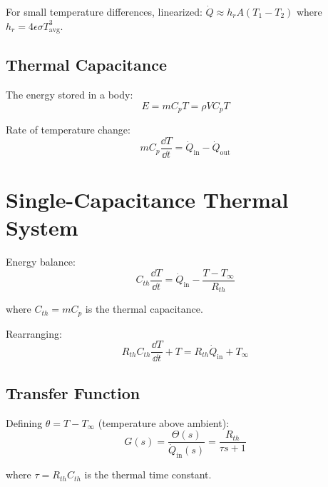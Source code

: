 For small temperature differences, linearized: $\dot{Q} \approx h_r A(T_1 - T_2)$ where $h_r = 4\epsilon\sigma T_{\text{avg}}^3$.

\subsection{Thermal Capacitance}

The energy stored in a body:
\begin{equation}
E = mC_pT = \rho V C_p T
\end{equation}

Rate of temperature change:
\begin{equation}
mC_p\frac{\dd T}{\dd t} = \dot{Q}_{\text{in}} - \dot{Q}_{\text{out}}
\end{equation}

\section{Single-Capacitance Thermal System}
\label{sec:single_thermal}



Energy balance:
\begin{equation}
C_{th}\frac{\dd T}{\dd t} = \dot{Q}_{\text{in}} - \frac{T - T_\infty}{R_{th}}
\end{equation}

where $C_{th} = mC_p$ is the thermal capacitance.

Rearranging:
\begin{equation}
\boxed{R_{th}C_{th}\frac{\dd T}{\dd t} + T = R_{th}\dot{Q}_{\text{in}} + T_\infty}
\end{equation}

\subsection{Transfer Function}

Defining $\theta = T - T_\infty$ (temperature above ambient):
\begin{equation}
G(s) = \frac{\Theta(s)}{\dot{Q}_{\text{in}}(s)} = \frac{R_{th}}{\tau s + 1}
\end{equation}

where $\tau = R_{th}C_{th}$ is the thermal time constant.

